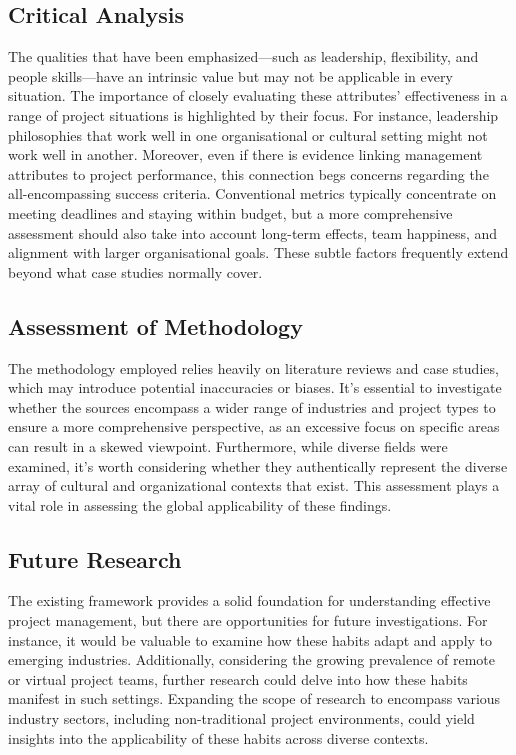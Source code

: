 \documentclass{article}
\begin{document}
\subsection{Critical Analysis}

The qualities that have been emphasized—such as leadership, flexibility, and people skills—have an intrinsic value but may not be applicable in every situation. The importance of closely evaluating these attributes' effectiveness in a range of project situations is highlighted by their focus. For instance, leadership philosophies that work well in one organisational or cultural setting might not work well in another. Moreover, even if there is evidence linking management attributes to project performance, this connection begs concerns regarding the all-encompassing success criteria. Conventional metrics typically concentrate on meeting deadlines and staying within budget, but a more comprehensive assessment should also take into account long-term effects, team happiness, and alignment with larger organisational goals. These subtle factors frequently extend beyond what case studies normally cover.

\subsection{Assessment of Methodology}

The methodology employed relies heavily on literature reviews and case studies, which may introduce potential inaccuracies or biases. It's essential to investigate whether the sources encompass a wider range of industries and project types to ensure a more comprehensive perspective, as an excessive focus on specific areas can result in a skewed viewpoint. Furthermore, while diverse fields were examined, it's worth considering whether they authentically represent the diverse array of cultural and organizational contexts that exist. This assessment plays a vital role in assessing the global applicability of these findings.

\subsection{Future Research}

The existing framework provides a solid foundation for understanding effective project management, but there are opportunities for future investigations. For instance, it would be valuable to examine how these habits adapt and apply to emerging industries. Additionally, considering the growing prevalence of remote or virtual project teams, further research could delve into how these habits manifest in such settings. Expanding the scope of research to encompass various industry sectors, including non-traditional project environments, could yield insights into the applicability of these habits across diverse contexts.
\end{document}
